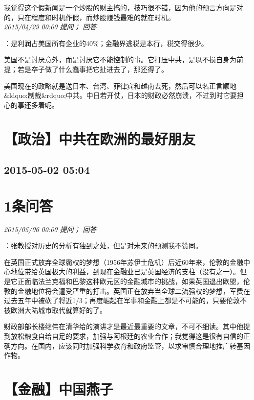 \documentclass[twocolumn]{ctexart}
\begin{document}
我觉得这个假新闻是一个炒股的财主搞的，技巧很不错，因为他的预言方向是对的，只在程度和时机作假，而炒股赚钱最难的就在时机。\\

\textit{\hfill\noindent\small 2015/04/29 00:00 提问； 回答}

：是利润占美国所有企业的40\%；金融界逃税是本行，税交得很少。

美国不是讨厌意外，而是讨厌它不能控制的事。它打压中共，是以不损自身为前提；若是卒子做了什么蠢事把它扯进去了，那还得了。

美国现在的政略就是送日本、台湾、菲律宾和越南去死，然后可以名正言顺地\&ldquo;制裁\&rdquo;中共。中日若开仗，日本的财政必然崩溃，不过到时它要担心的事还多着呢。\\


\section{【政治】中共在欧洲的最好朋友}
\subsection{2015-05-02 05:04}


\section{1条问答}

\textit{\hfill\noindent\small 2015/05/06 00:00 提问； 回答}

：张教授对历史的分析有独到之处，但是对未来的预测我不赞同。

在英国正式放弃全球霸权的梦想（1956年苏伊士危机）后近60年来，伦敦的金融中心地位带给英国极大的利益，到现在金融业已是英国经济的支柱（没有之一）。但是它正面临法兰克福和巴黎这种欧元区的金融城市的挑战，如果英国退出欧盟，伦敦的金融地位将会遭受严重的打击。英国正在放弃当全球二流强权的梦想，军费在过去五年中被砍了将近1/3；再度崛起在军事和金融上都是不可能的，只要伦敦不被欧洲大陆城市取代就算好的了。

财政部部长楼继伟在清华给的演讲才是最近最重要的文章，不可不细读。其中他提到放松粮食自给自足的要求，加强与阿根廷的农业合作；我觉得这是很有自信的正确方向。在国内，应该同时加强科学教育和政府监管，以求审慎合理地推广转基因作物。
\\


\section{【金融】中国燕子}
\end{document}
